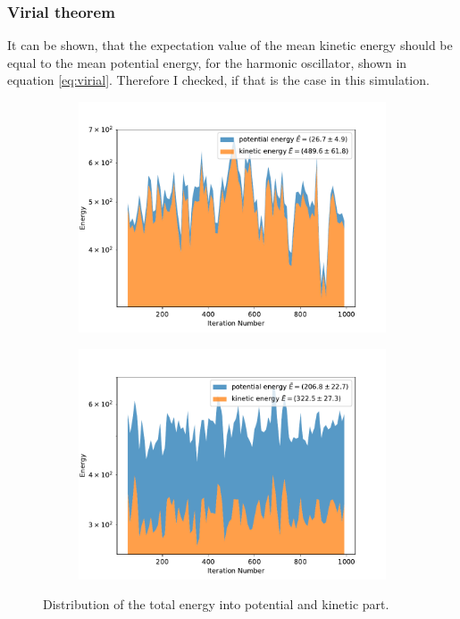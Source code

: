 \documentclass{scrartcl}
\begin{document}
	\subsubsection{Virial theorem}
		It can be shown, that the expectation value of the mean kinetic energy should be equal to the mean potential energy, for the harmonic oscillator, shown in equation \ref{eq:virial}.
		Therefore I checked, if that is the case in this simulation.
		\begin{figure}[H]
			\centering
				\begin{subfigure}[c]{0.49\textwidth}
					\includegraphics[width=\textwidth]{../imgs/harmonic_oscillator_track/track_1000100_heavy_virial_log.pdf}
					\label{fig:track_1000100_heavy_virial_log}
				\end{subfigure}
				\begin{subfigure}[c]{0.49\textwidth}
					\includegraphics[width=\textwidth]{../imgs/harmonic_oscillator_track/track_1000100_virial_log.pdf}
					\label{fig:track_1000100_virial_log}
				\end{subfigure}
			\caption{Distribution of the total energy into potential and kinetic part.}
			\label{fig:track_1000100_virial}
		\end{figure}
\end{document}

